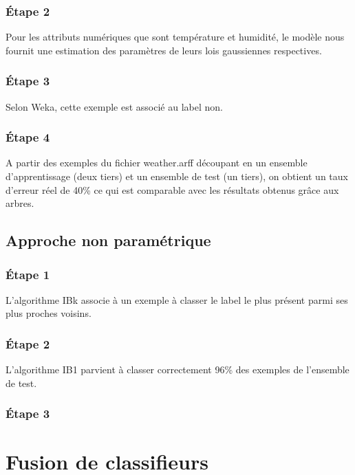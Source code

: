\documentclass[a4paper,12pt]{article}
\begin{document}
\subsubsection*{\'Etape 2}
Pour les attributs numériques que sont température et humidité, le modèle nous fournit une estimation des paramètres de leurs lois gaussiennes respectives.

\subsubsection*{\'Etape 3}
Selon Weka, cette exemple est associé au label non.

\subsubsection*{\'Etape 4}
A partir des exemples du fichier weather.arff découpant en un ensemble d'apprentissage (deux tiers) et un ensemble de test (un tiers), on obtient un taux d'erreur réel de 40\% ce qui est comparable avec les résultats obtenus grâce aux arbres.

\subsection{Approche non paramétrique}

\subsubsection*{\'Etape 1}
L'algorithme IBk associe à un exemple à classer le label le plus présent parmi ses plus proches voisins.

\subsubsection*{\'Etape 2}
L'algorithme IB1 parvient à classer correctement 96\% des exemples de l'ensemble de test.

\subsubsection*{\'Etape 3}

\section{Fusion de classifieurs}
\end{document}
